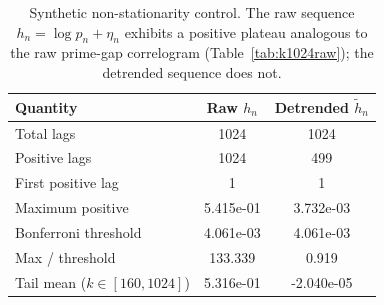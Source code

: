 \begin{table}[H]\centering
\begin{tabular}{lcc}\toprule
Quantity & Raw $h_n$ & Detrended $\tilde h_n$ \\ \midrule
Total lags & 1024 & 1024 \\
Positive lags & 1024 & 499 \\
First positive lag & 1 & 1 \\
Maximum positive & 5.415e-01 & 3.732e-03 \\
Bonferroni threshold & 4.061e-03 & 4.061e-03 \\
Max / threshold & 133.339 & 0.919 \\
Tail mean ($k\in[160,1024]$) & 5.316e-01 & -2.040e-05 \\
\bottomrule\end{tabular}
\caption{Synthetic non-stationarity control. The raw sequence $h_n = \log p_n + \eta_n$ exhibits a positive plateau analogous to the raw prime-gap correlogram (Table~\ref{tab:k1024raw}); the detrended sequence does not.}
\label{tab:B1}\end{table}
